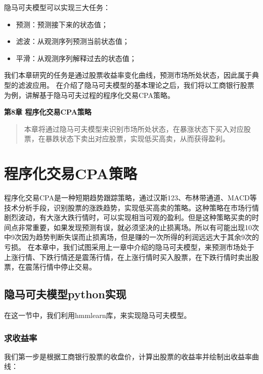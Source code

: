 \documentclass{article}
\begin{document}
隐马可夫模型可以实现三大任务：
\begin{itemize}
\item 预测：预测接下来的状态值；
\item 滤波：从观测序列预测当前状态值；
\item 平滑：从观测序列解释过去的状态值；
\end{itemize}
我们本章研究的任务是通过股票收益率变化曲线，预测市场所处状态，因此属于典型的滤波应用。\newline
在介绍了隐马可夫模型的基本理论之后，我们将以工商银行股票为例，讲解基于隐马可夫过程的程序化交易CPA策略。

\maketitle\begin{center}
\Large \textbf{第8章 程序化交易CPA策略}
\end{center}
\begin{abstract}
本章将通过隐马可夫模型来识别市场所处状态，在暴涨状态下买入对应股票，在暴跌状态下卖出对应股票，实现低买高卖，从而获得盈利。
\end{abstract}
\section{程序化交易CPA策略}
程序化交易CPA是一种短期趋势跟踪策略，通过汉斯123、布林带通道、MACD等技术分析手段，识别股票的涨跌趋势，实现低买高卖的策略。这种策略在市场行情剧烈波动，有大涨大跌行情时，可以实现相当可观的盈利。但是这种策略买卖的时间点非常重要，如果发现预测有误，就必须坚决的止损离场。所以有可能出现10次中9次因为趋势判断失误而止损离场，但是赚的一次所得的利润远远大于其余9次的亏损。\newline
在本章中，我们试图采用上一章中介绍的隐马可夫模型，来预测市场处于上涨行情、下跌行情还是震荡行情，在上涨行情时买入股票，在下跌行情时卖出股票，在震荡行情中停止交易。
\subsection{隐马可夫模型python实现}
在这一节中，我们利用hmmlearn库，来实现隐马可夫模型。
\subsubsection{求收益率}
我们第一步是根据工商银行股票的收盘价，计算出股票的收益率并绘制出收益率曲线：
\end{document}

